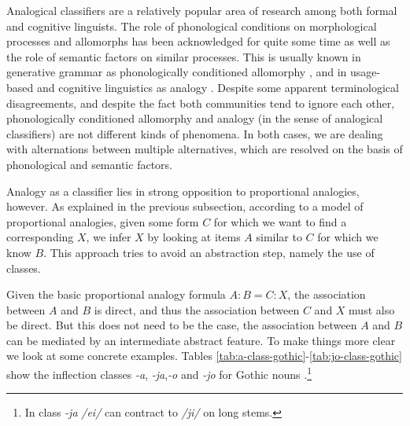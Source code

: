Analogical classifiers are a relatively popular area of research among both formal and cognitive linguists. The role of phonological conditions on morphological processes and allomorphs has been acknowledged for quite some time \autocites{Kurylowicz.1945, Bybee.1982, Carstairs.1990} as well as the role of semantic factors \autocite{Malkiel.1988} on similar processes. This is usually known in generative grammar as phonologically conditioned allomorphy \autocite{Nevins.2011a}, and in usage-based and cognitive linguistics as analogy \autocite{Bybee.1982}. Despite some apparent terminological disagreements, and despite the fact both communities tend to ignore each other, phonologically conditioned allomorphy and analogy (in the sense of analogical classifiers) are not different kinds of phenomena. In both cases, we are dealing with alternations between multiple alternatives, which are resolved on the basis of phonological and semantic factors.

Analogy as a classifier lies in strong opposition to proportional analogies, however. As explained in the previous subsection, according to a model of proportional analogies, given some form $C$ for which we want to find a corresponding $X$, we infer $X$ by looking at items $A$ similar to $C$ for which we know $B$. This approach tries to avoid an abstraction step, namely the use of classes.

Given the basic proportional analogy formula $A:B=C:X$, the association between $A$ and $B$ is direct, and thus the association between $C$ and $X$ must also be direct. But this does not need to be the case, the association between $A$ and $B$ can be mediated by an intermediate abstract feature. To make things more clear we look at some concrete examples. Tables \ref{tab:a-class-gothic}-\ref{tab:jo-class-gothic} show the inflection classes \textit{-a}, \textit{-ja},\textit{-o} and \textit{-jo} for Gothic nouns \autocite{Braune.1895}.\footnote{In class \textit{-ja} \textit{/ei/} can contract to \textit{/ji/} on long stems.}


